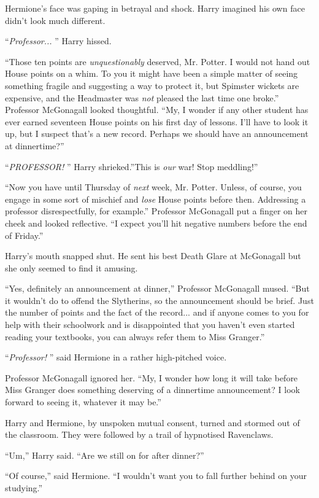Hermione's face was gaping in betrayal and shock. Harry imagined his own
face didn't look much different.

``\emph{Professor...} '' Harry hissed.

``Those ten points are \emph{unquestionably} deserved, Mr. Potter. I
would not hand out House points on a whim. To you it might have been a
simple matter of seeing something fragile and suggesting a way to
protect it, but Spimster wickets are expensive, and the Headmaster was
\emph{not} pleased the last time one broke.'' Professor McGonagall
looked thoughtful. ``My, I wonder if any other student has ever earned
seventeen House points on his first day of lessons. I'll have to look it
up, but I suspect that's a new record. Perhaps we should have an
announcement at dinnertime?''

``\emph{PROFESSOR!} '' Harry shrieked.''This is \emph{our} war! Stop
meddling!''

``Now you have until Thursday of \emph{next} week, Mr. Potter. Unless, of
course, you engage in some sort of mischief and \emph{lose} House points
before then. Addressing a professor disrespectfully, for example.''
Professor McGonagall put a finger on her cheek and looked reflective.
``I expect you'll hit negative numbers before the end of Friday.''

Harry's mouth snapped shut. He sent his best Death Glare at McGonagall
but she only seemed to find it amusing.

``Yes, definitely an announcement at dinner,'' Professor McGonagall
mused. ``But it wouldn't do to offend the Slytherins, so the
announcement should be brief. Just the number of points and the fact of
the record... and if anyone comes to you for help with their
schoolwork and is disappointed that you haven't even started reading
your textbooks, you can always refer them to Miss Granger.''

``\emph{Professor!} '' said Hermione in a rather high-pitched voice.

Professor McGonagall ignored her. ``My, I wonder how long it will take
before Miss Granger does something deserving of a dinnertime
announcement? I look forward to seeing it, whatever it may be.''

Harry and Hermione, by unspoken mutual consent, turned and stormed out
of the classroom. They were followed by a trail of hypnotised
Ravenclaws.

``Um,'' Harry said. ``Are we still on for after dinner?''

``Of course,'' said Hermione. ``I wouldn't want you to fall further
behind on your studying.''

